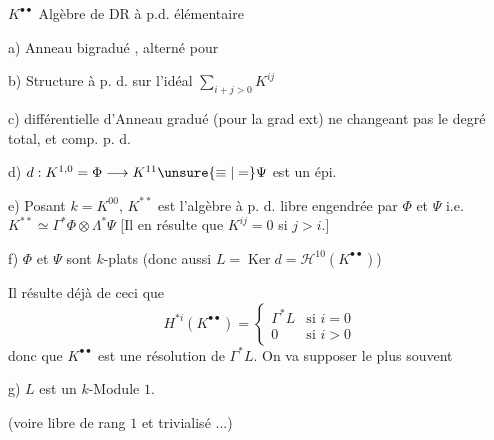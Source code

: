 $K^{\bullet\bullet}$ Algèbre de DR à p.d. élémentaire

a) Anneau bigradué ,  alterné pour 

b)  Structure à p. d. sur l'idéal $\sum_{i+j>0}K^{ij}$

c) différentielle d'Anneau gradué (pour la grad ext) ne changeant pas le degré total, et comp.  p. d.

d) $d:K^{1,0}=\Phi\longrightarrow K^{11}\unsure{\equiv|=}\Psi$ est un épi.

e) Posant $k=K^{00}$, $K^{**}$ est l'algèbre  à p. d. libre engendrée par $\Phi$ et $\Psi$ i.e. $K^{**}\simeq\Gamma^*\Phi\otimes\Lambda^*\Psi$ [Il en résulte que $K^{ij}=0$ si $j>i$.]

f)  $\Phi$ et $\Psi$ sont $k$-plats (donc aussi $L=\operatorname{Ker}d=\mathscr H^{10}(K^{\bullet\bullet})$)

Il résulte déjà de ceci que
\[
H^{*i}(K^{\bullet\bullet})=
\begin{cases}
\Gamma^*L & \text{si }i=0\\
0 & \text{si }i>0
\end{cases}
\]
donc que $K^{\bullet\bullet}$ est une résolution de $\Gamma^*L$. On va supposer le plus souvent

g) $L$ est un $k$-Module  $1$.

(voire libre de rang $1$ et trivialisé ...)
